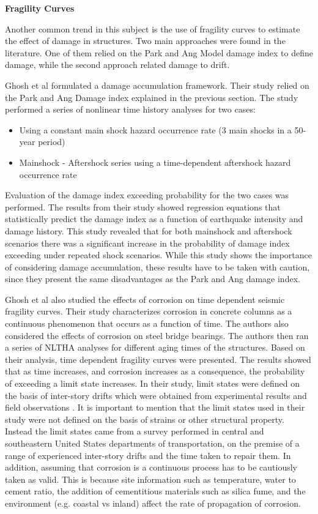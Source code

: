 \textbf{Fragility Curves}

Another common trend in this subject is the use of fragility curves to estimate the effect of damage in structures. Two main approaches were found in the literature. One of them relied on the Park and Ang Model damage index to define damage, while the second approach related damage to drift.

Ghosh et al \cite{Ghosh2015} formulated a damage accumulation framework. Their study relied on the Park and Ang Damage index explained in the previous section. The study performed a series of nonlinear time history analyses for two cases:

\begin{itemize}
	\item Using a constant main shock hazard occurrence rate (3 main shocks in a 50-year period)
	\item Mainshock - Aftershock series using a time-dependent aftershock hazard occurrence rate
\end{itemize}

Evaluation of the damage index exceeding probability for the two cases was performed. The results from their study showed regression equations that statistically predict the damage index as a function of earthquake intensity and damage history. This study revealed that for both mainshock and aftershock scenarios there was a significant increase in the probability of damage index exceeding under repeated shock scenarios. While this study shows the importance of considering damage accumulation, these results have to be taken with caution, since they present the same disadvantages as the Park and Ang damage index.

Ghosh et al \cite{Ghosh2010} also studied the effects of corrosion on time dependent seismic fragility curves. Their study characterizes corrosion in concrete columns as a continuous phenomenon that occurs as a function of time. The authors also considered the effects of corrosion on steel bridge bearings. The authors then ran a series of NLTHA analyses for different aging times of the structures. Based on their analysis, time dependent fragility curves were presented. The results showed that as time increases, and corrosion increases as a consequence, the probability of exceeding a limit state increases. In their study, limit states were defined on the basis of inter-story drifts which were obtained from experimental results and field observations \cite{Padgett2007}. It is important to mention that the limit states used in their study were not defined on the basis of strains or other structural property. Instead the limit states came from a survey performed in central and southeastern United States departments of transportation, on the premise of a range of experienced inter-story drifts and the time taken to repair them. In addition, assuming that corrosion is a continuous process has to be cautiously taken as valid. This is because site information such as temperature, water to cement ratio, the addition of cementitious materials such as silica fume, and the environment (e.g. coastal vs inland) affect the rate of propagation of corrosion\cite{Thoft-Christensen}.

